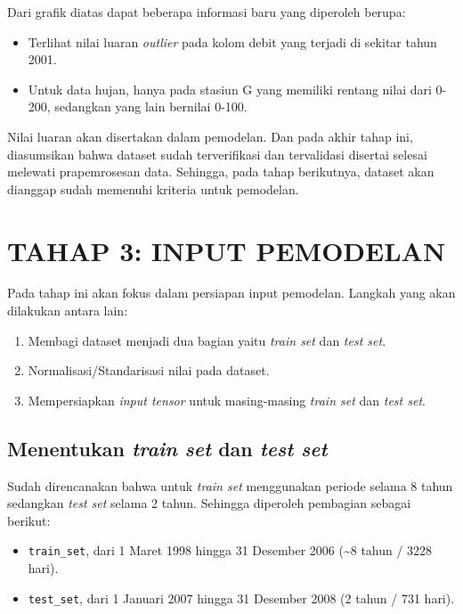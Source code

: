 \documentclass[11pt]{article}
\providecommand{\tightlist}{%
      \setlength{\itemsep}{0pt}\setlength{\parskip}{0pt}}
\begin{document}
    Dari grafik diatas dapat beberapa informasi baru yang diperoleh berupa:

\begin{itemize}
\tightlist
\item
  Terlihat nilai luaran \emph{outlier} pada kolom debit yang terjadi di
  sekitar tahun 2001.
\item
  Untuk data hujan, hanya pada stasiun G yang memiliki rentang nilai
  dari 0-200, sedangkan yang lain bernilai 0-100.
\end{itemize}

Nilai luaran akan disertakan dalam pemodelan. Dan pada akhir tahap ini,
diasumsikan bahwa dataset sudah terverifikasi dan tervalidasi disertai
selesai melewati prapemrosesan data. Sehingga, pada tahap berikutnya,
dataset akan dianggap sudah memenuhi kriteria untuk pemodelan.

    \hypertarget{tahap-3-input-pemodelan}{%
\section{TAHAP 3: INPUT PEMODELAN}\label{tahap-3-input-pemodelan}}

Pada tahap ini akan fokus dalam persiapan input pemodelan. Langkah yang
akan dilakukan antara lain:

\begin{enumerate}
\def\labelenumi{\arabic{enumi}.}
\tightlist
\item
  Membagi dataset menjadi dua bagian yaitu \emph{train set} dan
  \emph{test set}.
\item
  Normalisasi/Standarisasi nilai pada dataset.
\item
  Mempersiapkan \emph{input tensor} untuk masing-masing \emph{train set}
  dan \emph{test set}.
\end{enumerate}

    \hypertarget{menentukan-train-set-dan-test-set}{%
\subsection{\texorpdfstring{Menentukan \emph{train set} dan \emph{test
set}}{Menentukan train set dan test set}}\label{menentukan-train-set-dan-test-set}}

Sudah direncanakan bahwa untuk \emph{train set} menggunakan periode
selama 8 tahun sedangkan \emph{test set} selama 2 tahun. Sehingga
diperoleh pembagian sebagai berikut:

\begin{itemize}
\tightlist
\item
  \texttt{train\_set}, dari 1 Maret 1998 hingga 31 Desember 2006
  (\textasciitilde8 tahun / 3228 hari).
\item
  \texttt{test\_set}, dari 1 Januari 2007 hingga 31 Desember 2008 (2
  tahun / 731 hari).
\end{itemize}
\end{document}
